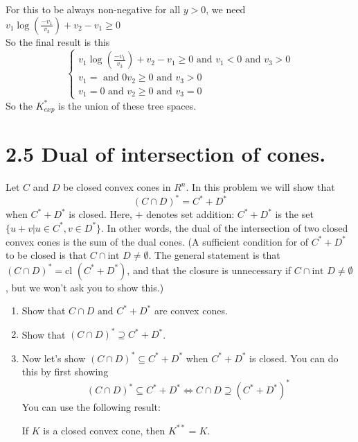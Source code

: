 \documentclass[a4paper]{article}
\begin{document}
\begin{latin}
For this to be always non-negative for all $ y > 0 $, we need $ v_{1}\log(\frac{-v_{1}}{v_{3}}) + v_{2} - v_{1} \geq 0 $
\\
So the final result is this
\begin{equation*}
	\begin{cases}
		v_{1}\log(\frac{-v_{1}}{v_{3}}) + v_{2} - v_{1} \geq 0 \text{ and } v_{1} < 0 \text{ and }  v_{3} > 0
		\\
		v_{1} = \text{ and } 0 v_{2} \geq 0 \text{ and } v_{3} > 0
		\\
		v_{1} = 0 \text{ and }  v_{2} \geq 0 \text{ and } v_{3} = 0 
	\end{cases}
\end{equation*}
So the  $ K_{exp}^{*} $ is the union of these tree spaces.
\section{2.5 Dual of intersection of cones.}
Let $ C $ and $ D $ be closed convex cones in $ R^{n} $. In this problem we will
show that 
\begin{equation*}
	(C \cap D)^{*} = C^{*} + D^{*}
\end{equation*}
when $ C^{*} + D^{*} $ is closed. Here, $ + $ denotes set addition: $ C^{*} + D^{*} $ is the set $ \{u + v | u \in C^{*}, v \in D^{*}\} $. In other words, the dual of the intersection of two closed convex cones is the sum of the dual cones. (A sufficient condition for of $ C^{*} + D^{*} $ to be closed is that
$ C \cap \text{int } D \neq \emptyset $. The general statement is
that $ (C \cap D)^{*} = \text{cl }(C^{*} + D^{*}) $, and that the closure is unnecessary if $ C \cap \text{int } D \neq \emptyset $, but we won’t ask you to show this.)
\begin{enumerate}
	\item Show that $ C \cap D \text{ and } C^{*} + D^{*} $ are convex cones.
	\item Show that $ (C \cap D)^{*} \supseteq C^{*} + D^{*} $.
	\item Now let’s show $ (C \cap D)^{*} \subseteq C^{*} + D^{*} $ when $ C^{*} + D^{*} $ is closed. You can do this by first showing
	\begin{equation*}
		(C \cap D)^{*} \subseteq C^{*}+ D^{*}  \Leftrightarrow C \cap D \supseteq (C^{*} + D^{*})^{*}
	\end{equation*}
	You can use the following result:
	\begin{center}
		If $ K $ is a closed convex cone, then $ K^{**} = K $.
	\end{center}

\end{enumerate}
\end{latin}
\end{document}
